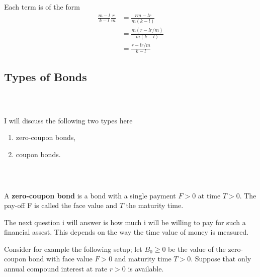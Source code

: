 \documentclass{beamer}
\numberwithin{equation}{section}
\begin{document}
\begin{frame}\frametitle{{\normalsize \secname} \\ {\large \subsecname}}
    Each term is of the form
    \begin{align*}
        \frac{m-l}{k-l} \frac{r}{m} &= \frac{rm - lr}{m(k-l)}\\
        &= \frac{m(r - lr/m)}{m(k - l)}\\
        &= \frac{r - lr/m}{k-l}
    \end{align*}
\end{frame}

\subsection{Types of Bonds}

\begin{frame}\frametitle{{\normalsize \secname} \\ {\large \subsecname}}
    I will discuss the following two types here
    \begin{enumerate}
        \item zero-coupon bonds,
        \item coupon bonds.
    \end{enumerate}
\end{frame}

\begin{frame}\frametitle{{\normalsize \secname} \\ {\large \subsecname}}
    A \textbf{zero-coupon bond} is a bond with a single payment $F > 0$ at time $T > 0$.
    The pay-off F is called the face value and $T$ the maturity time.
    \vspace{1em}

    The next question i will answer is how much i will be willing to pay for such a financial assest.
    This depends on the way the time value of money is measured.
    \vspace{1em}

    Consider for example the following setup; let $B_0 \geq 0$ be the value of the zero-coupon bond with face value $F>0$ and maturity time $T>0$.
    Suppose that only annual compound interest at rate $r>0$ is available.
\end{frame}
\end{document}
